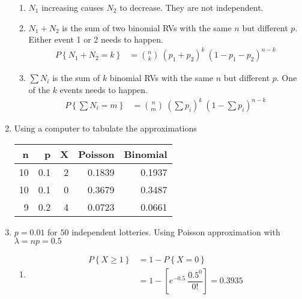 \begin{enumerate}
\begin{enumerate}
			\item $ N_1 $ increasing causes $ N_2 $ to decrease. They are not independent.
			
			\item $ N_1 + N_2 $ is the sum of two binomial RVs with the same $ n $ but different $ p $. Either event 1 or 2 needs to happen.
			\begin{align}
				P \left\{N_1 + N_2 = k \right\} &= \binom{n}{k}\ (p_1 + p_2)^k\ (1-p_1 - p_2)^{n-k} 
			\end{align}
			
			\item $ \sum N_i $ is the sum of $ k $ binomial RVs with the same $ n $ but different $ p $. One of the $ k $ events needs to happen.
			\begin{align}
				P \left\{\sum N_i = m \right\} &= \binom{n}{m}\ \left(\sum p_i\right)^k\ \left(1-\sum p_i\right)^{n-k} 
			\end{align}
			
		\end{enumerate}
	 
	
	\item Using a computer to tabulate the approximations\\
	
	\begin{table}[H]
		\centering
		\begin{tabular}{@{}rrrrr@{}}
			\toprule
			n &    p &  X &   Poisson &  Binomial \\
			\midrule
			10 &  0.1 &  2 &  0.1839 &    0.1937 \\
			10 &  0.1 &  0 &  0.3679 &    0.3487 \\
			9 &  0.2 &  4 &  0.0723 &    0.0661 \\
		\end{tabular}
	\end{table}
	
	\item $ p = 0.01 $ for $ 50 $ independent lotteries. Using Poisson approximation with $ \lambda = np = 0.5 $\\
	
		\begin{enumerate}
			\item 
			\begin{align}
				P \left\{X \geq 1\right\} &= 1 - P \left\{X = 0\right\} \nonumber \\
				&= 1 - \left[e^{-0.5} \ \dfrac{0.5^0}{0!}\right] = 0.3935
			\end{align}
			

\end{enumerate}
\end{enumerate}
